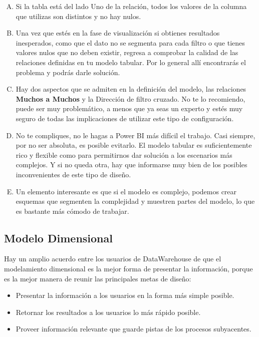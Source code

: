\documentclass[11pt,a4paper]{article}
\begin{document}
			\begin{enumerate}[A.]
				\item Si la tabla está del lado Uno de la relación, todos los valores de la columna que utilizas son distintos y no hay nulos.
				\item Una vez que estés en la fase de visualización si obtienes resultados inesperados, como que el dato no se segmenta para cada filtro o que tienes valores nulos que no deben existir, regresa a comprobar la calidad de las relaciones definidas en tu modelo tabular. Por lo general allí encontrarás el problema y podrás darle solución.
				\item Hay dos aspectos que se admiten en la definición del modelo, las relaciones\textbf{ Muchos a Muchos} y la Dirección de filtro cruzado. No te lo recomiendo, puede ser muy problemático, a menos que ya seas un experto y estés muy seguro de todas las implicaciones de utilizar este tipo de configuración.
				\item No te compliques, no le hagas a Power BI más difícil el trabajo. Casi siempre, por no ser absoluta, es posible evitarlo. El modelo tabular es suficientemente rico y flexible como para permitirnos dar solución a los escenarios más complejos.  Y si no queda otra, hay que informarse muy bien de los posibles inconvenientes de este tipo de diseño.	
				\item Un elemento interesante es que si el modelo es complejo, podemos crear esquemas que segmenten la complejidad y muestren partes del modelo, lo que es bastante más cómodo de trabajar.
				
			\end{enumerate}
			
		\subsection{Modelo Dimensional}
		
		Hay un amplio acuerdo entre los usuarios de DataWarehouse de que el modelamiento dimensional es la mejor forma de presentar la información, porque es la mejor manera de reunir las principales metas de diseño:
			
			\begin{itemize}
				\item Presentar la información a los usuarios en la forma más simple posible.
				\item Retornar los resultados a los usuarios lo más rápido posible.
				\item Proveer información relevante que guarde pistas de los procesos subyacentes.
			\end{itemize}
\end{document}
